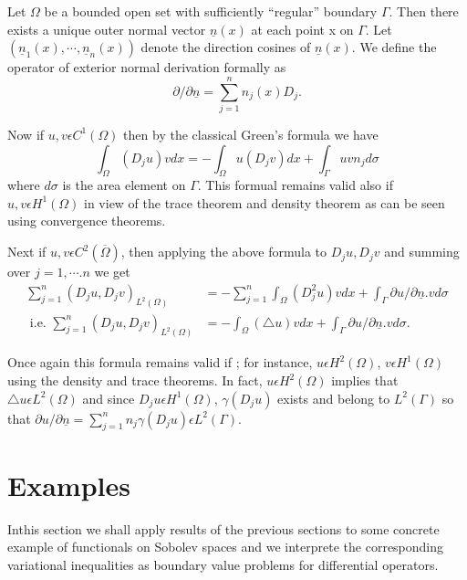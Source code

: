 \medskip
{} Let $\Omega$ be a bounded open set with sufficiently ``regular'' boundary $\Gamma$. Then there exists a unique outer normal vector $\underline{n}(x)$ at each point x on $\Gamma$. Let $(\underline{n}_{1} (x), \cdots , \underline{n}_{n} (x))$ denote the direction cosines of $\underline{n}(x)$. We define the operator of exterior normal derivation formally as
\begin{equation*}
\partial / \partial \underline{n} = \sum_{j=1}^{n} n_{j} (x) D_{j}.\tag{4.9}\label{chap2-eq4.9}
\end{equation*}

Now if $u, v \epsilon C^{1} (\Omega)$ then by the classical Green's formula we have
$$
\int_{\Omega} (D_{j} u)v dx = -\int_{\Omega} u(D_{j} v) dx + \int_{\Gamma} uv n_{j} d\sigma
$$
where $d\sigma$ is the area element on $\Gamma$. This formual remains valid also if $u, v \epsilon H^{1}(\Omega)$ in view of the trace theorem and density theorem as can be seen using convergence theorems.

Next if $u, v \epsilon C^{2} (\overline{\Omega})$, then applying the above formula to $D_{j} u , D_{j} v$ and summing over $j=1, \cdots . n$ we get
\begin{align*}
\sum_{j=1}^{n} (D_{j} u, D_{j} v)_{L^{2} (\Omega)} & = -\sum_{j=1}^{n} \int_{\Omega} (D_{j}^{2} u) v dx + \int_{\Gamma} \partial u / \partial \underline{n} . vd \sigma\\
\text{ i.e. }\sum_{j=1}^{n} (D_{j} u, D_{j} v)_{L^{2} (\Omega)} & = -\int_{\Omega} (\triangle u) v dx + \int_{\Gamma} \partial u / \partial \underline{n} . v d \sigma.\tag{4.10}\label{chap2-eq4.10}
\end{align*}

Once again this formula remains valid if ; for instance, $u \epsilon H^{2} (\Omega)$, $v \epsilon H^{1} (\Omega)$ using the density and trace theorems. In fact, $u \epsilon H^{2} (\Omega)$ implies that $\triangle u \epsilon L^{2} (\Omega)$ and since $D_{j} u \epsilon H^{1} (\Omega)$, $\gamma(D_{j}u)$ exists and belong to $L^{2}(\Gamma)$ so that $\partial u / \partial \underline{n} = \sum_{j=1}^{n} n_{j} \gamma (D_{j} u) \epsilon L^{2}(\Gamma)$.

\section{Examples}\label{chap2-sec5}
In\pageoriginale this section we shall apply results of the previous sections to some concrete example of functionals on Sobolev spaces and we interprete the corresponding variational inequalities as boundary value problems for differential operators.


